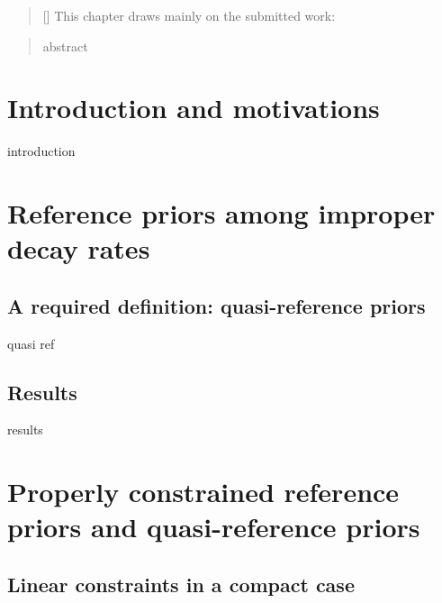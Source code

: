 

\begin{abstract}[\hspace*{-10pt}]
    This chapter draws mainly on the submitted work:   %
\end{abstract}

\begin{abstract}
    abstract
\end{abstract}

\minitoc



\section{Introduction and motivations}

introduction


\section{Reference priors among improper decay rates}

    \subsection{A required definition: quasi-reference priors}

    quasi ref

    \subsection{Results}

    results

\section{Properly constrained reference priors and quasi-reference priors}

    \subsection{Linear constraints in a compact case}

